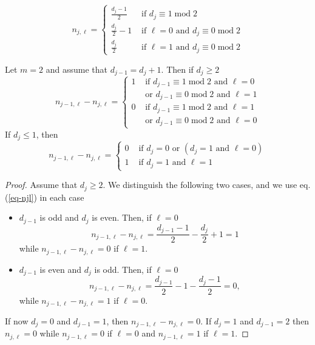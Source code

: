 \documentclass[10pt,a4paper]{amsart}
\renewcommand{\mod}{{\;\mathrm{mod} \;}}
\begin{document}
\begin{equation}
\label{eq-njl}
n_{j,\ell}=
\begin{cases}
\frac{d_j-1}{2} & \text{ if } d_j \equiv 1 \mod 2
\\
\frac{d_j}{2}-1 & \text{ if } \ell=0 \text{ and } d_j \equiv 0 \mod 2
\\
\frac{d_j}{2} & \text{ if } \ell=1 \text{ and } d_j \equiv 0 \mod 2
\end{cases}
\end{equation}

\begin{lemma}
\label{lemma:njl}
Let $m=2$ and assume that $d_{j-1}=d_j+1$. Then if $d_{j} \geq 2$
\[
  n_{j-1,\ell}-n_{j,\ell}=
  \begin{cases}
  1  & \text{ if } d_{j-1}\equiv 1 \mod2 \text{ and }  \ell=0
  \\
    &  \text{ or } d_{j-1}\equiv 0 \mod 2 \text{ and } \ell=1
  \\
  0  & \text{ if } d_{j-1}\equiv 1 \mod2 \text{ and }  \ell=1
  \\
    &  \text{ or } d_{j-1}\equiv 0 \mod 2 \text{ and } \ell= 0
  \end{cases}
\]
If $d_{j} \leq 1$, then
\[
  n_{j-1,\ell}-n_{j,\ell}=
  \begin{cases}
  0 & \text{ if } d_{j}=0 \text{ or } (d_j=1 \text{ and } \ell=0) \\
  1 & \text{ if } d_j=1 \text{ and } \ell=1
  \end{cases}
\] 
\end{lemma}

\begin{proof}
Assume that $d_j\geq 2$. 
We distinguish the following two cases, and we use eq. (\ref{eq-njl}) in each case
\begin{itemize}[leftmargin=10pt]
\item $d_{j-1}$ is odd and $d_{j}$ is even. Then, if $\ell=0$
\[
  n_{j-1,\ell}-n_{j,\ell}=\frac{d_{j-1}-1}{2}- \frac{d_{j}}{2}+1=1
\]
while $n_{j-1,\ell}-n_{j,\ell}=0$ if $\ell=1$. 
\item $d_{j-1}$ is even and $d_{j}$ is odd. Then, if $\ell=0$
\[
  n_{j-1,\ell}-n_{j,\ell}=\frac{d_{j-1}}{2}-1- \frac{d_{j}-1}{2}=0,
\]
while $n_{j-1,\ell}-n_{j,\ell}=1$ if $\ell=0$.
\end{itemize}
If now $d_j=0$ and $d_{j-1}=1$, then $n_{j-1,\ell}-n_{j,\ell}=0$. If $d_j=1$ and $d_{j-1}=2$ then $n_{j,\ell}=0$ while $n_{j-1,\ell}=0$ if $\ell=0$ and $n_{j-1,\ell}=1$ if $\ell=1$.
\end{proof}
\end{document}
